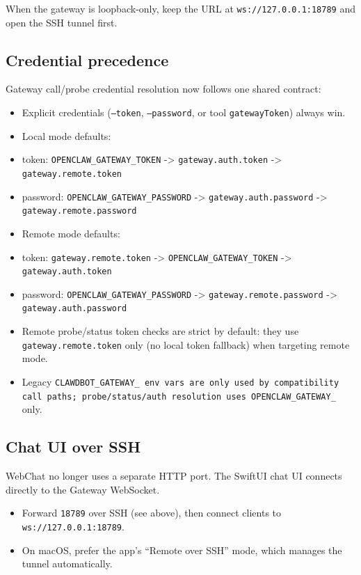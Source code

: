 When the gateway is loopback-only, keep the URL at \texttt{ws://127.0.0.1:18789} and open the SSH tunnel first.

\subsection{Credential precedence}


Gateway call/probe credential resolution now follows one shared contract:

\begin{itemize}
  \item Explicit credentials (\texttt{--token}, \texttt{--password}, or tool \texttt{gatewayToken}) always win.
  \item Local mode defaults:
  \item token: \texttt{OPENCLAW\_GATEWAY\_TOKEN} -> \texttt{gateway.auth.token} -> \texttt{gateway.remote.token}
  \item password: \texttt{OPENCLAW\_GATEWAY\_PASSWORD} -> \texttt{gateway.auth.password} -> \texttt{gateway.remote.password}
  \item Remote mode defaults:
  \item token: \texttt{gateway.remote.token} -> \texttt{OPENCLAW\_GATEWAY\_TOKEN} -> \texttt{gateway.auth.token}
  \item password: \texttt{OPENCLAW\_GATEWAY\_PASSWORD} -> \texttt{gateway.remote.password} -> \texttt{gateway.auth.password}
  \item Remote probe/status token checks are strict by default: they use \texttt{gateway.remote.token} only (no local token fallback) when targeting remote mode.
  \item Legacy \texttt{CLAWDBOT\_GATEWAY\_\textit{} env vars are only used by compatibility call paths; probe/status/auth resolution uses \texttt{OPENCLAW\_GATEWAY\_}} only.
\end{itemize}


\subsection{Chat UI over SSH}


WebChat no longer uses a separate HTTP port. The SwiftUI chat UI connects directly to the Gateway WebSocket.

\begin{itemize}
  \item Forward \texttt{18789} over SSH (see above), then connect clients to \texttt{ws://127.0.0.1:18789}.
  \item On macOS, prefer the app’s “Remote over SSH” mode, which manages the tunnel automatically.
\end{itemize}


